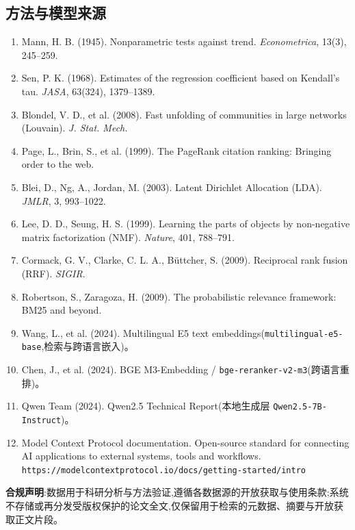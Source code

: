 \subsection{方法与模型来源}
\begin{enumerate}[label=R\arabic*.]
\item Mann, H. B. (1945). Nonparametric tests against trend. \textit{Econometrica}, 13(3), 245--259.
\item Sen, P. K. (1968). Estimates of the regression coefficient based on Kendall's tau. \textit{JASA}, 63(324), 1379--1389.
\item Blondel, V. D., et al. (2008). Fast unfolding of communities in large networks (Louvain). \textit{J. Stat. Mech.}
\item Page, L., Brin, S., et al. (1999). The PageRank citation ranking: Bringing order to the web.
\item Blei, D., Ng, A., Jordan, M. (2003). Latent Dirichlet Allocation (LDA). \textit{JMLR}, 3, 993--1022.
\item Lee, D. D., Seung, H. S. (1999). Learning the parts of objects by non-negative matrix factorization (NMF). \textit{Nature}, 401, 788--791.
\item Cormack, G. V., Clarke, C. L. A., Büttcher, S. (2009). Reciprocal rank fusion (RRF). \textit{SIGIR}.
\item Robertson, S., Zaragoza, H. (2009). The probabilistic relevance framework: BM25 and beyond.
\item Wang, L., et al. (2024). Multilingual E5 text embeddings(\texttt{multilingual-e5-base},检索与跨语言嵌入)。
\item Chen, J., et al. (2024). BGE M3-Embedding / \texttt{bge-reranker-v2-m3}(跨语言重排)。
\item Qwen Team (2024). Qwen2.5 Technical Report(本地生成层 \texttt{Qwen2.5-7B-Instruct})。
\item Model Context Protocol documentation. Open-source standard for connecting AI applications to external systems, tools and workflows. \texttt{https://modelcontextprotocol.io/docs/getting-started/intro}
\end{enumerate}

\begin{plainbox}
\textbf{合规声明}:数据用于科研分析与方法验证,遵循各数据源的开放获取与使用条款;系统不存储或再分发受版权保护的论文全文,仅保留用于检索的元数据、摘要与开放获取正文片段。
\end{plainbox}
